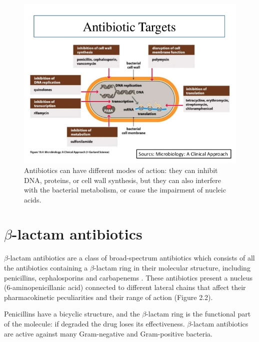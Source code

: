 \documentclass[11pt]{report}
\begin{document}
\clearpage
\begin{figure}[htp]
\centering
\includegraphics[scale=0.700]{immagini gamalero/Antibiotic_Targets.jpg}
\caption{Antibiotics can have different modes of action: they can inhibit DNA, proteins, or cell wall  synthesis, but they can also interfere with the bacterial metabolism, or cause the impairment of nucleic acids.}
\label{}
\end{figure}

\section{$\beta$-lactam antibiotics}
$\beta$-lactam antibiotics are a class of broad-spectrum antibiotics which consists of all the antibiotics containing a $\beta$-lactam ring in their molecular structure, including penicillins, cephalosporins and carbapenems \cite{Pitout2005}.
These antibiotics present a nucleus (6-aminopenicillanic acid) connected to different lateral chains that affect their pharmacokinetic peculiarities and their range of action (Figure 2.2).

Penicillins have a bicyclic structure, and the $\beta$-lactam ring is the functional part of the molecule: if degraded the drug loses its effectiveness.
$\beta$-lactam antibiotics are active against many Gram-negative and Gram-positive bacteria.
\end{document}
